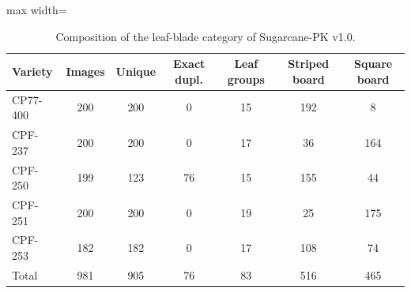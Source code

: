 \begin{table}[tbp]
\centering
\small
\caption{Composition of the leaf-blade category of Sugarcane-PK v1.0.}
\label{tab:dataset}
\begin{adjustbox}{max width=\textwidth}
\begin{tabular}{lcccccc}
\toprule
Variety & Images & Unique & Exact dupl. & Leaf groups & Striped board & Square board \\
\midrule
CP77-400 & 200 & 200 & 0 & 15 & 192 & 8 \\
CPF-237 & 200 & 200 & 0 & 17 & 36 & 164 \\
CPF-250 & 199 & 123 & 76 & 15 & 155 & 44 \\
CPF-251 & 200 & 200 & 0 & 19 & 25 & 175 \\
CPF-253 & 182 & 182 & 0 & 17 & 108 & 74 \\
\midrule
Total & 981 & 905 & 76 & 83 & 516 & 465 \\
\bottomrule
\end{tabular}
\end{adjustbox}
\end{table}
